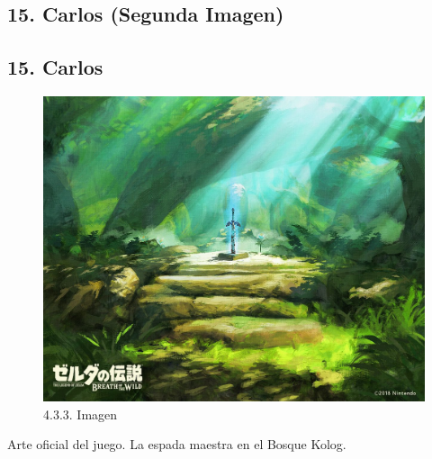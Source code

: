 \documentclass[12pt]{article}
\begin{document}
\subsection{15. Carlos (Segunda Imagen)}
            \subsection{15. Carlos}
    \begin{figure}[H]
      \centering
      \includegraphics[width=\textwidth]{images/Concepts/15_concept_art.jpg}
      \caption{\small 4.3.3. Imagen}
    \end{figure}
    Arte oficial del juego. La espada maestra en el Bosque Kolog.
\end{document}

